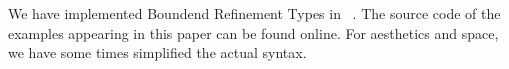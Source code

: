 We have implemented Boundend Refinement Types in \toolname~\citep{realworldliquid}.
%
The source code of the examples appearing in this paper can be found online\footnotemark[1].
%
For aesthetics and space, we have some times simplified the actual \toolname syntax.

\begin{comment}

Consider for example the function @checkGt@
that takes a list of integers @xs@ and an integer @y@
and if each element in @xs@ is less than @y@ it
returns unit, otherwise it crashes.

\begin{code}
  checkGt :: [Int] -> Int -> ()
  checkGt (x:xs) y | x < y = checkGt xs y
  checkGt []     _         = ()
\end{code}

We want to give @checkGt@ a type that checks
\textit{crash freedom}, \ie we should give it a 
precondition that states that each element of @xs@ is
less that @y@.
%
Note that if @checkGt@'s arguments were flipped than 
we could state the desired precondition using vanilla 
refinement types to name the first argument as @y@
and specify that each element of the list should be an 
Integer greater than @y@.
%
\begin{code}
  checkGt :: y:Int -> [{x:Int | x < y}] -> ()
\end{code}

\begin{code}
  checkGt :: (Gt p q) => [{x:Int | p x}] -> {y:Int | q y} -> ()
\end{code}


\begin{code}
  bound Gt p q = \x y -> p x => q y => x < y 
\end{code}


Consider for example the following function that 
takes as argument a list @xs@ of Integers,
an Integer @y@ and if @xs@ has exactly one element @x@
which is greater than @y@ then it returns @x@, 
otherwise @ex@ crashes. 
%
\begin{code}
    CheckGt :: [Int] -> Int -> ()
    checkGt (x:xs) y | x > y = checkGt xs y
    checkGt []     _         = ()
\end{code}
%
We want to type @checkGt@ in such a way as to 
prove crash freedom 
\ie give @checkGt@ a precondition that states that 
all the elements in the list @xs@ are greater that @y@. 







\end{comment}
